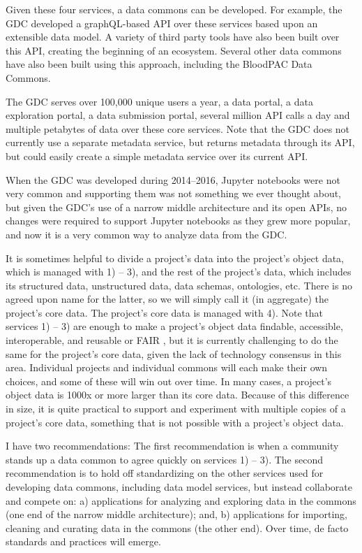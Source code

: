 \documentclass{article}
\newcommand{\ph}[1]{\medbreak \noindent {\bf #1}}
\begin{document}
Given these four services, a data commons can be developed. For example, the GDC developed a graphQL-based API over these services based upon an extensible data model. A variety of third party tools have also been built over this API, creating the beginning of an ecosystem. Several other data commons have also been built using this approach, including the BloodPAC Data Commons.

The GDC serves over 100,000 unique users a year, a data portal, a data exploration portal, a data submission portal, several million API calls a day and multiple petabytes of data over these core services. Note that the GDC does not currently use a separate metadata service, but returns metadata through its API, but could easily create a simple metadata service over its current API.

When the GDC was developed during 2014--2016, Jupyter notebooks were not very common and supporting them was not something we ever thought about, but given the GDC’s use of a narrow middle architecture and its open APIs, no changes were required to support Jupyter notebooks as they grew more popular, and now it is a very common way to analyze data from the GDC.

It is sometimes helpful to divide a project’s data into the project’s object data, which is managed with 1) -- 3), and the rest of the project's data, which includes its structured data, unstructured data, data schemas, ontologies, etc. There is no agreed upon name for the latter, so we will simply call it (in aggregate) the project's core data. The project's core data is managed with 4). Note that services 1) -- 3) are enough to make a project’s object data findable, accessible, interoperable, and reusable or FAIR \cite{wilkinson2016fair}, but it is currently challenging to do the same for the project's core data, given the lack of technology consensus in this area. Individual projects and individual commons will each make their own choices, and some of these will win out over time. In many cases, a project’s object data is 1000x or more larger than its core data. Because of this difference in size, it is quite practical to support and experiment with multiple copies of a project's core data, something that is not possible with a project’s object data.

\ph{Two recommendations.} I have two recommendations: The first recommendation is when a community stands up a data common to agree quickly on services 1) -- 3). The second recommendation is to hold off standardizing on the other services used for developing data commons, including data model services, but instead collaborate and compete on: a) applications for analyzing and exploring data in the commons (one end of the narrow middle architecture); and, b) applications for importing, cleaning and curating data in the commons (the other end). Over time, de facto standards and practices will emerge.
\end{document}
